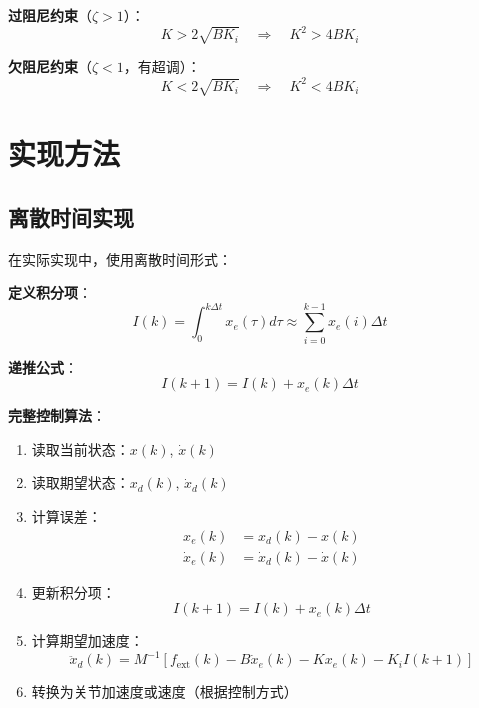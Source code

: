 \documentclass[12pt,a4paper]{article}
\begin{document}
\textbf{过阻尼约束}（$\zeta > 1$）：
\begin{equation}
K > 2\sqrt{BK_i} \quad \Rightarrow \quad K^2 > 4BK_i
\end{equation}

\textbf{欠阻尼约束}（$\zeta < 1$，有超调）：
\begin{equation}
K < 2\sqrt{BK_i} \quad \Rightarrow \quad K^2 < 4BK_i
\end{equation}

\section{实现方法}

\subsection{离散时间实现}

在实际实现中，使用离散时间形式：

\textbf{定义积分项}：
\begin{equation}
I(k) = \int_0^{k\Delta t} x_e(\tau) d\tau \approx \sum_{i=0}^{k-1} x_e(i) \Delta t
\end{equation}

\textbf{递推公式}：
\begin{equation}
I(k+1) = I(k) + x_e(k) \Delta t \tag{13}
\end{equation}

\textbf{完整控制算法}：

\begin{enumerate}
\item 读取当前状态：$x(k)$, $\dot{x}(k)$
\item 读取期望状态：$x_d(k)$, $\dot{x}_d(k)$
\item 计算误差：
\begin{align}
x_e(k) &= x_d(k) - x(k) \\
\dot{x}_e(k) &= \dot{x}_d(k) - \dot{x}(k)
\end{align}
\item 更新积分项：
\begin{equation}
I(k+1) = I(k) + x_e(k) \Delta t
\end{equation}
\item 计算期望加速度：
\begin{equation}
\ddot{x}_d(k) = M^{-1}[f_{\text{ext}}(k) - B\dot{x}_e(k) - Kx_e(k) - K_i I(k+1)]
\end{equation}
\item 转换为关节加速度或速度（根据控制方式）
\end{enumerate}
\end{document}
